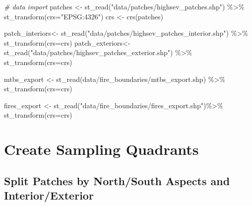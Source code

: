 \documentclass[
]{book}
\newenvironment{Shaded}{\begin{snugshade}}{\end{snugshade}}
\newcommand{\AttributeTok}[1]{\textcolor[rgb]{0.77,0.63,0.00}{#1}}
\newcommand{\CommentTok}[1]{\textcolor[rgb]{0.56,0.35,0.01}{\textit{#1}}}
\newcommand{\FunctionTok}[1]{\textcolor[rgb]{0.00,0.00,0.00}{#1}}
\newcommand{\NormalTok}[1]{#1}
\newcommand{\OtherTok}[1]{\textcolor[rgb]{0.56,0.35,0.01}{#1}}
\newcommand{\SpecialCharTok}[1]{\textcolor[rgb]{0.00,0.00,0.00}{#1}}
\newcommand{\StringTok}[1]{\textcolor[rgb]{0.31,0.60,0.02}{#1}}
\begin{document}
\begin{Shaded}
\begin{Highlighting}[]
\CommentTok{\# data import}
\NormalTok{patches }\OtherTok{\textless{}{-}} \FunctionTok{st\_read}\NormalTok{(}\StringTok{"data/patches/highsev\_patches.shp"}\NormalTok{) }\SpecialCharTok{\%\textgreater{}\%} 
  \FunctionTok{st\_transform}\NormalTok{(}\AttributeTok{crs=}\StringTok{"EPSG:4326"}\NormalTok{)}
\NormalTok{crs }\OtherTok{\textless{}{-}} \FunctionTok{crs}\NormalTok{(patches)}

\NormalTok{patch\_interiors}\OtherTok{\textless{}{-}} \FunctionTok{st\_read}\NormalTok{(}\StringTok{"data/patches/highsev\_patches\_interior.shp"}\NormalTok{) }\SpecialCharTok{\%\textgreater{}\%}
  \FunctionTok{st\_transform}\NormalTok{(}\AttributeTok{crs=}\NormalTok{crs)}
\NormalTok{patch\_exteriors}\OtherTok{\textless{}{-}} \FunctionTok{st\_read}\NormalTok{(}\StringTok{"data/patches/highsev\_patches\_exterior.shp"}\NormalTok{) }\SpecialCharTok{\%\textgreater{}\%}
  \FunctionTok{st\_transform}\NormalTok{(}\AttributeTok{crs=}\NormalTok{crs)}

\NormalTok{mtbs\_export }\OtherTok{\textless{}{-}} \FunctionTok{st\_read}\NormalTok{(}\StringTok{\textquotesingle{}data/fire\_boundaries/mtbs\_export.shp\textquotesingle{}}\NormalTok{) }\SpecialCharTok{\%\textgreater{}\%} 
  \FunctionTok{st\_transform}\NormalTok{(}\AttributeTok{crs=}\NormalTok{crs) }

\NormalTok{fires\_export }\OtherTok{\textless{}{-}} \FunctionTok{st\_read}\NormalTok{(}\StringTok{"data/fire\_boundaries/fires\_export.shp"}\NormalTok{)}\SpecialCharTok{\%\textgreater{}\%} 
  \FunctionTok{st\_transform}\NormalTok{(}\AttributeTok{crs=}\NormalTok{crs)}
\end{Highlighting}
\end{Shaded}

\hypertarget{create-sampling-quadrants}{%
\section{Create Sampling Quadrants}\label{create-sampling-quadrants}}

\hypertarget{split-patches-by-northsouth-aspects-and-interiorexterior}{%
\subsection{Split Patches by North/South Aspects and Interior/Exterior}\label{split-patches-by-northsouth-aspects-and-interiorexterior}}
\end{document}
